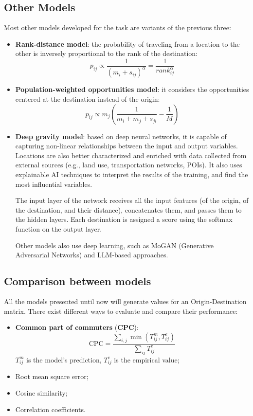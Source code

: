 \subsection{Other Models}
Most other models developed for the task are variants of the previous three:
\begin{itemize}
    \item \textbf{Rank-distance model}: the probability of traveling from a location to the other is inversely proportional to the rank of the destination:
    \begin{equation*}
        p_{ij} \propto \frac{1}{(m_i + s_{ij})^{\alpha}} = \frac{1}{\textit{rank}_{ij}^{\alpha}}
    \end{equation*}
    \item \textbf{Population-weighted opportunities model}: it considers the opportunities centered at the destination instead of the origin:
    \begin{equation*}
        p_{ij} \propto m_j \left(\frac{1}{m_i + m_j + s_{ji}} - \frac{1}{M}\right)
    \end{equation*}
    \item \textbf{Deep gravity model}: based on deep neural networks, it is capable of capturing non-linear relationships between the input and output variables. Locations are also better characterized and enriched with data collected from external sources (e.g., land use, transportation networks, POIs). It also uses explainable AI techniques to interpret the results of the training, and find the most influential variables. 
    
    The input layer of the network receives all the input features (of the origin, of the destination, and their distance), concatenates them, and passes them to the hidden layers. Each destination is assigned a score using the softmax function on the output layer.

    Other models also use deep learning, such as MoGAN (Generative Adversarial Networks) and LLM-based approaches.
\end{itemize}

\subsection{Comparison between models}

All the models presented until now will generate values for an Origin-Destination matrix. There exist different ways to evaluate and compare their performance:
\begin{itemize}
    \item \textbf{Common part of commuters} (\textbf{CPC}):
    \begin{equation*}
        \text{CPC} = \frac{\sum_{i,j} \min(T_{ij}^m , T_{ij}^e)}{\sum_{ij} T_{ij}^e}    
    \end{equation*}
    $T_{ij}^m$ is the model's prediction, $T_{ij}^e$ is the empirical value;
    \item Root mean square error;
    \item Cosine similarity;
    \item Correlation coefficients.
\end{itemize}
